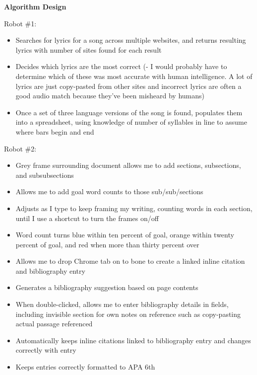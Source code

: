 \documentclass[12pt]{article}
\begin{document}
\vspace{1em}
\maketitle \textbf{Algorithm Design}

\vspace{0.5em}
Robot \#1: 
\begin{itemize}
    \item Searches for lyrics for a song across multiple websites, and returns resulting lyrics with number of sites found for each result
    \item Decides which lyrics are the most correct (- I would probably have to determine which of these was most accurate with human intelligence. A lot of lyrics are just copy-pasted from other sites and incorrect lyrics are often a good audio match because they've been misheard by humans)
    \item Once a set of three language versions of the song is found, populates them into a spreadsheet, using knowledge of number of syllables in line to assume where bars begin and end
\end{itemize}

Robot \#2:
\begin{itemize}
    \item Grey frame surrounding document allows me to add sections, subsections, and subsubsections
    \item Allows me to add goal word counts to those sub/sub/sections
    \item Adjusts as I type to keep framing my writing, counting words in each section, until I use a shortcut to turn the frames on/off
    \item Word count turns blue within ten percent of goal, orange within twenty percent of goal, and red when more than thirty percent over
    \item Allows me to drop Chrome tab on to bone to create a linked inline citation and bibliography entry
    \item Generates a bibliography suggestion based on page contents
    \item When double-clicked, allows me to enter bibliography details in fields, including invisible section for own notes on reference such as copy-pasting actual passage referenced
    \item Automatically keeps inline citations linked to bibliography entry and changes correctly with entry
    \item Keeps entries correctly formatted to APA 6th
\end{itemize}
\end{document}
